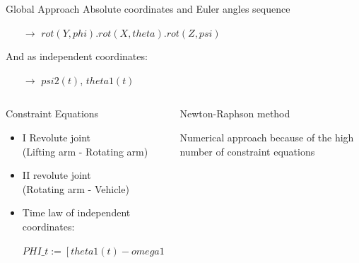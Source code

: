 \documentclass{beamer}              %
\begin{document}
	\begin{frame}{Global Approach}
		\small 
		Absolute coordinates and Euler angles sequence 
		\begin{itemize}
			\item[$\rightarrow$] $rot(Y,phi).rot(X,theta).rot(Z,psi)$
		\end{itemize}
		

		And as independent coordinates:		
		\begin{itemize}
			\item[$\rightarrow$] $psi2(t)$, $theta1(t)$
		\end{itemize} 
			
		\begin{columns}
			\begin{column}[t]{0.55\textwidth}	
				\begin{block}{\small \centering Constraint Equations}\scriptsize		
					\begin{itemize}
						\item I Revolute joint \\						
						(Lifting arm - Rotating arm)						
						\item II revolute joint \\
						(Rotating arm - Vehicle)						
						\item Time law of independent coordinates:
						
						{\tiny $PHI{\_}t := [theta1(t)-omega1{\cdot}t, psi2(t)-omega2{\cdot}t]$}
					\end{itemize}
				\end{block}	
			\end{column}
			\begin{column}[t]{0.45\textwidth}
				\begin{block}{\small \centering Newton-Raphson method}
					
					\bigskip 
					
					\footnotesize		
					 Numerical approach because of the high number of constraint equations
				\end{block}
			\end{column}	
		\end{columns}		
	\end{frame}	
\end{document}
